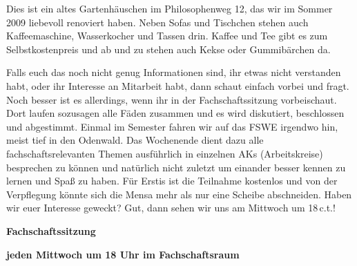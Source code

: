 Dies ist ein altes Gartenhäuschen im Philosophenweg 12, das wir im Sommer 2009 liebevoll renoviert haben. Neben Sofas und Tischchen stehen auch Kaffeemaschine, Wasserkocher und Tassen drin. Kaffee und Tee gibt es zum Selbstkostenpreis und ab und zu stehen auch Kekse oder Gummibärchen da.


Falls euch das noch nicht genug Informationen sind, ihr etwas nicht verstanden habt, oder ihr Interesse an Mitarbeit habt, dann schaut einfach vorbei und fragt. Noch besser ist es allerdings, wenn ihr in der Fachschaftssitzung vorbeischaut. Dort laufen sozusagen alle Fäden zusammen und es wird diskutiert, beschlossen und abgestimmt. Einmal im Semester fahren wir auf das \gls{FSWE} irgendwo hin, meist tief in den Odenwald. Das Wochenende dient dazu alle fachschaftsrelevanten Themen ausführlich in einzelnen AKs (Arbeitskreise) besprechen zu können und natürlich nicht zuletzt um einander besser kennen zu lernen und Spaß zu haben. Für Erstis ist die Teilnahme kostenlos und von der Verpflegung könnte sich die Mensa mehr als nur eine Scheibe abschneiden.
Haben wir euer Interesse geweckt? Gut, dann sehen wir uns am Mittwoch um 18\,\gls{c.t.}!

\begin{center}
\large
\textbf{Fachschaftssitzung}

\textbf{jeden Mittwoch um 18 Uhr im Fachschaftsraum}
\end{center}
